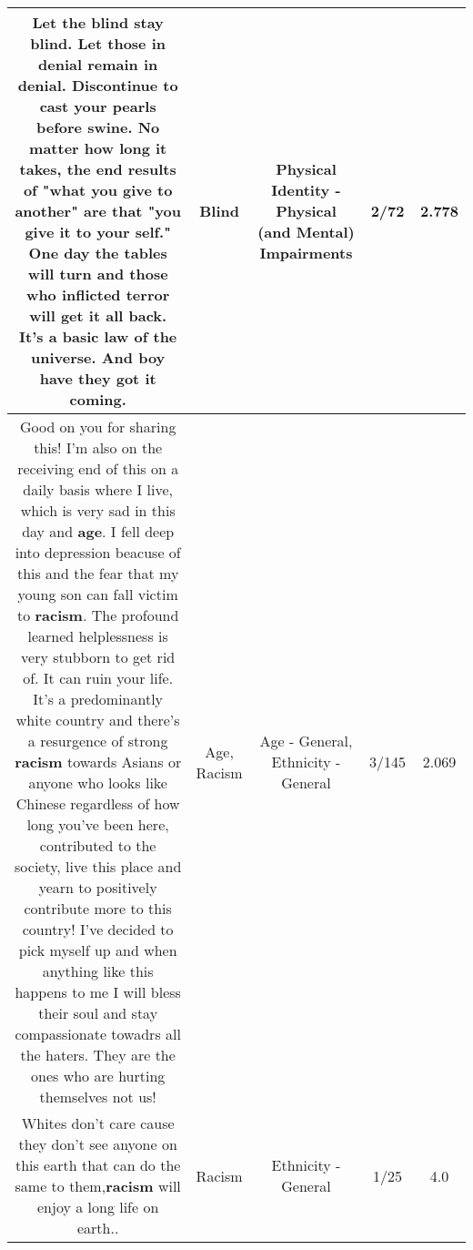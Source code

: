\documentclass[11pt]{article}
\newlength\mylength
\begin{document}
\begin{center}
\begin{longtable}{|C{.65\mylength}|C{.30\mylength}|C{.12\mylength}|C{.12\mylength}|C{.12\mylength}|}
  \small Let the \textbf{blind} stay \textbf{blind}. Let those in denial remain in denial. Discontinue to cast your pearls before swine. No matter how long it takes, the end results of "what you give to another" are that "you give it to your self." One day the tables will turn and those who inflicted terror will get it all back. It's a basic law of the universe. And boy have they got it coming.\normalsize   & Blind & Physical Identity - Physical (and Mental) Impairments & 2/72 & 2.778 \\  \hline
  \small Good on you for sharing this! I'm also on the receiving end of this on a daily basis where I live, which is very sad in this day and \textbf{age}. I fell deep into depression beacuse of this and the fear that my young son can fall victim to \textbf{racism}. The profound learned helplessness is very stubborn to get rid of. It can ruin your life. It's a predominantly white country and there's a resurgence of strong \textbf{racism} towards Asians or anyone who looks like Chinese regardless of how long you've been here, contributed to the society, live this place and yearn to positively contribute more to this country! I've decided to pick myself up and when anything like this happens to me I will bless their soul and stay compassionate towadrs all the haters. They are the ones who are hurting themselves not us!\normalsize   & Age, Racism & Age - General, Ethnicity - General & 3/145 & 2.069 \\  \hline
  \small Whites don't care cause they don't see anyone on this earth that can do the same to them,\textbf{racism} will enjoy a long life on earth..\normalsize   & Racism & Ethnicity - General & 1/25 & 4.0 \\  \hline

\end{longtable}
\end{center}
\end{document}
